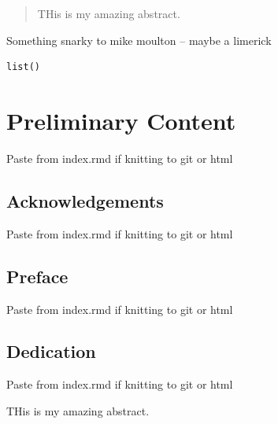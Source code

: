 \documentclass[12pt,twoside]{reedthesis}
\begin{document}
  \listoftables

  \listoffigures
  \begin{abstract}
    THis is my amazing abstract.
  \end{abstract}
  \begin{dedication}
    Something snarky to mike moulton -- maybe a limerick
  \end{dedication}
\mainmatter %
\pagestyle{fancyplain} %
\begin{verbatim}
list()
\end{verbatim}
\hypertarget{section}{%
\chapter*{}\label{section}}

\hypertarget{preliminary-content}{%
\chapter*{Preliminary Content}\label{preliminary-content}}

Paste from index.rmd if knitting to git or html

\hypertarget{acknowledgements}{%
\section*{Acknowledgements}\label{acknowledgements}}

Paste from index.rmd if knitting to git or html

\hypertarget{preface}{%
\section*{Preface}\label{preface}}

Paste from index.rmd if knitting to git or html

\hypertarget{dedication}{%
\section*{Dedication}\label{dedication}}

Paste from index.rmd if knitting to git or html

THis is my amazing abstract.
\end{document}
